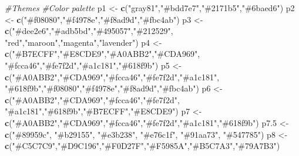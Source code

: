 \documentclass[
]{article}
\newenvironment{Shaded}{\begin{snugshade}}{\end{snugshade}}
\newcommand{\CommentTok}[1]{\textcolor[rgb]{0.56,0.35,0.01}{\textit{#1}}}
\newcommand{\FloatTok}[1]{\textcolor[rgb]{0.00,0.00,0.81}{#1}}
\newcommand{\FunctionTok}[1]{\textcolor[rgb]{0.13,0.29,0.53}{\textbf{#1}}}
\newcommand{\NormalTok}[1]{#1}
\newcommand{\OtherTok}[1]{\textcolor[rgb]{0.56,0.35,0.01}{#1}}
\newcommand{\StringTok}[1]{\textcolor[rgb]{0.31,0.60,0.02}{#1}}
\begin{document}
\begin{Shaded}
\begin{Highlighting}[]
\CommentTok{\#Themes}
\CommentTok{\#Color palette }
\NormalTok{p1 }\OtherTok{\textless{}{-}} \FunctionTok{c}\NormalTok{(}\StringTok{"gray81"}\NormalTok{,}\StringTok{"\#bdd7e7"}\NormalTok{,}\StringTok{"\#2171b5"}\NormalTok{,}\StringTok{"\#6baed6"}\NormalTok{)}
\NormalTok{p2 }\OtherTok{\textless{}{-}} \FunctionTok{c}\NormalTok{(}\StringTok{"\#f08080"}\NormalTok{,}\StringTok{"\#f4978e"}\NormalTok{,}\StringTok{"\#f8ad9d"}\NormalTok{,}\StringTok{"\#fbc4ab"}\NormalTok{)}
\NormalTok{p3 }\OtherTok{\textless{}{-}} \FunctionTok{c}\NormalTok{(}\StringTok{"\#dee2e6"}\NormalTok{,}\StringTok{"\#adb5bd"}\NormalTok{,}\StringTok{"\#495057"}\NormalTok{,}\StringTok{"\#212529"}\NormalTok{,}
        \StringTok{"red"}\NormalTok{,}\StringTok{"maroon"}\NormalTok{,}\StringTok{"magenta"}\NormalTok{,}\StringTok{"lavender"}\NormalTok{)}
\NormalTok{p4 }\OtherTok{\textless{}{-}} \FunctionTok{c}\NormalTok{(}\StringTok{"\#B7ECFF"}\NormalTok{,}\StringTok{"\#E8CDE9"}\NormalTok{,}\StringTok{"\#A0ABB2"}\NormalTok{,}\StringTok{"\#CDA969"}\NormalTok{,}
        \StringTok{"\#fcca46"}\NormalTok{,}\StringTok{"\#fe7f2d"}\NormalTok{,}\StringTok{"\#a1c181"}\NormalTok{,}\StringTok{"\#618f9b"}\NormalTok{)}
\NormalTok{p5 }\OtherTok{\textless{}{-}} \FunctionTok{c}\NormalTok{(}\StringTok{"\#A0ABB2"}\NormalTok{,}\StringTok{"\#CDA969"}\NormalTok{,}\StringTok{"\#fcca46"}\NormalTok{,}\StringTok{"\#fe7f2d"}\NormalTok{,}\StringTok{"\#a1c181"}\NormalTok{,}
        \StringTok{"\#618f9b"}\NormalTok{,}\StringTok{"\#f08080"}\NormalTok{,}\StringTok{"\#f4978e"}\NormalTok{,}\StringTok{"\#f8ad9d"}\NormalTok{,}\StringTok{"\#fbc4ab"}\NormalTok{)}
\NormalTok{p6 }\OtherTok{\textless{}{-}} \FunctionTok{c}\NormalTok{(}\StringTok{"\#A0ABB2"}\NormalTok{,}\StringTok{"\#CDA969"}\NormalTok{,}\StringTok{"\#fcca46"}\NormalTok{,}\StringTok{"\#fe7f2d"}\NormalTok{,}
        \StringTok{"\#a1c181"}\NormalTok{,}\StringTok{"\#618f9b"}\NormalTok{,}\StringTok{"\#B7ECFF"}\NormalTok{,}\StringTok{"\#E8CDE9"}\NormalTok{)}
\NormalTok{p7 }\OtherTok{\textless{}{-}} \FunctionTok{c}\NormalTok{(}\StringTok{"\#A0ABB2"}\NormalTok{,}\StringTok{"\#CDA969"}\NormalTok{,}\StringTok{"\#fcca46"}\NormalTok{,}\StringTok{"\#fe7f2d"}\NormalTok{,}\StringTok{"\#a1c181"}\NormalTok{,}\StringTok{"\#618f9b"}\NormalTok{)}
\NormalTok{p7}\FloatTok{.5} \OtherTok{\textless{}{-}} \FunctionTok{c}\NormalTok{(}\StringTok{"\#89959c"}\NormalTok{, }\StringTok{"\#b29155"}\NormalTok{, }\StringTok{"\#e3b238"}\NormalTok{, }\StringTok{"\#e76c1f"}\NormalTok{, }\StringTok{"\#91aa73"}\NormalTok{, }\StringTok{"\#547785"}\NormalTok{)}
\NormalTok{p8 }\OtherTok{\textless{}{-}} \FunctionTok{c}\NormalTok{(}\StringTok{"\#C5C7C9"}\NormalTok{,}\StringTok{"\#D9C196"}\NormalTok{,}\StringTok{"\#F0D27F"}\NormalTok{,}\StringTok{"\#F5985A"}\NormalTok{,}\StringTok{"\#B5C7A3"}\NormalTok{,}\StringTok{"\#79A7B3"}\NormalTok{)}

\end{Highlighting}
\end{Shaded}
\end{document}

